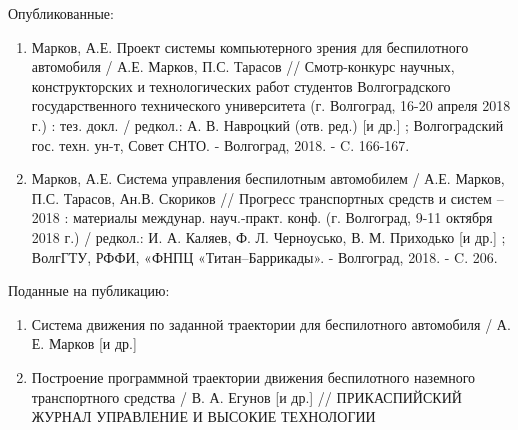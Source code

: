 Опубликованные:
\begin{enumerate}
    \item Марков, А.Е. Проект системы компьютерного зрения для беспилотного автомобиля / А.Е. Марков, П.С. Тарасов
          // Смотр-конкурс научных, конструкторских и технологических работ студентов Волгоградского государственного
          технического университета (г. Волгоград, 16-20 апреля 2018 г.) : тез. докл. / редкол.: А. В. Навроцкий (отв. ред.)
          [и др.] ; Волгоградский гос. техн. ун-т, Совет СНТО. - Волгоград, 2018. - C. 166-167.
    \item  Марков, А.Е. Система управления беспилотным автомобилем / А.Е. Марков, П.С. Тарасов, Ан.В. Скориков //
           Прогресс транспортных средств и систем – 2018 : материалы междунар. науч.-практ. конф. (г. Волгоград,
           9-11 октября 2018 г.) / редкол.: И. А. Каляев, Ф. Л. Черноусько, В. М. Приходько [и др.] ; ВолгГТУ, РФФИ,
           «ФНПЦ «Титан–Баррикады». - Волгоград, 2018. - C. 206.
\end{enumerate}

\bigskip
Поданные на публикацию:
\begin{enumerate}
    \item Система движения по заданной траектории для беспилотного автомобиля / А. Е. Марков [и др.]
    \item Построение программной траектории движения беспилотного наземного транспортного средства /
          В. А. Егунов [и др.] // ПРИКАСПИЙСКИЙ ЖУРНАЛ УПРАВЛЕНИЕ И ВЫСОКИЕ ТЕХНОЛОГИИ
\end{enumerate}


